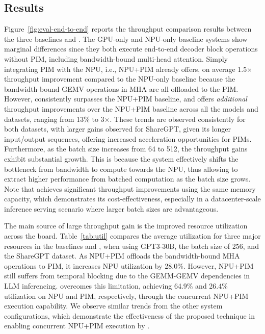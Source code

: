 \subsection{Results}
\label{sec:eval}
%
%
Figure~\ref{fig:eval-end-to-end} reports the throughput comparison results between the three baselines and \neupims. 
%
The GPU-only and NPU-only baseline systems show marginal differences since they both execute end-to-end decoder block operations without PIM, including bandwidth-bound multi-head attention.
%
Simply integrating PIM with the NPU, i.e., NPU+PIM already offers, on average 1.5$\times$ throughput improvement compared to the NPU-only baseline because the bandwidth-bound GEMV operations in MHA are all offloaded to the PIM.
%
However, \neupims consistently surpasses the NPU+PIM baseline, and offers \emph{additional} throughput improvements over the NPU+PIM baseline across all the models and datasets, ranging from 13\% to 3$\times$.
%
These trends are observed consistently for both datasets, with larger gains observed for ShareGPT, given its longer input/output sequences, offering increased acceleration opportunities for PIMs.
%
Furthermore, as the batch size increases from 64 to 512, the throughput gains exhibit substantial growth. 
%
This is because the \neupims system effectively shifts the bottleneck from bandwidth to compute towards the NPU, thus allowing \neupims to extract higher performance from batched computation as the batch size grows. 
%
Note that \neupims achieves significant throughput improvements using the same memory capacity, which demonstrates its cost-effectiveness, especially in a datacenter-scale inference serving scenario where larger batch sizes are advantageous.  

%

%
%
The main source of large throughput gain is the improved resource utilization across the board. 
%
Table~\ref{tab:util} compares the average utilization for three major resources in the baselines and \neupims, when using GPT3-30B, the batch size of 256, and the ShareGPT dataset.  
%
As NPU+PIM offloads the bandwidth-bound MHA operations to PIM, it increases NPU utilization by 28.0\%.
%
However, NPU+PIM still suffers from temporal blocking due to the GEMM-GEMV dependencies in LLM inferencing. 
%
\neupims overcomes this limitation, achieving 64.9\% and 26.4\% utilization on NPU and PIM, respectively, through the concurrent NPU+PIM execution capability.
% 
We observe similar trends from the other system configurations, which demonstrate the effectiveness of the proposed technique in enabling concurrent NPU+PIM execution by \neupims.

